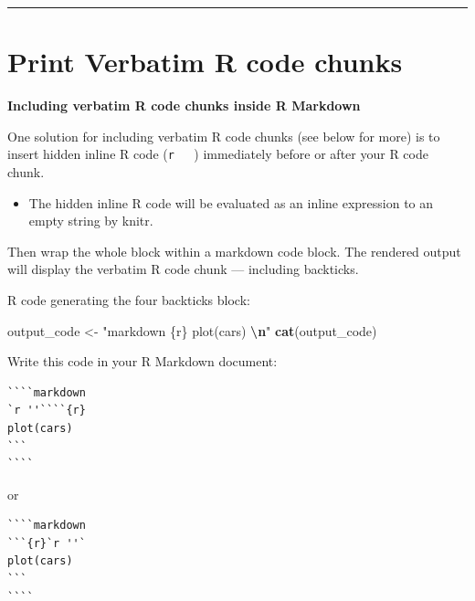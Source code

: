 \documentclass[
]{book}
\newenvironment{Shaded}{\begin{snugshade}}{\end{snugshade}}
\newcommand{\FunctionTok}[1]{\textcolor[rgb]{0.13,0.29,0.53}{\textbf{#1}}}
\newcommand{\NormalTok}[1]{#1}
\newcommand{\OtherTok}[1]{\textcolor[rgb]{0.56,0.35,0.01}{#1}}
\newcommand{\SpecialCharTok}[1]{\textcolor[rgb]{0.81,0.36,0.00}{\textbf{#1}}}
\newcommand{\StringTok}[1]{\textcolor[rgb]{0.31,0.60,0.02}{#1}}
\providecommand{\tightlist}{%
  \setlength{\itemsep}{0pt}\setlength{\parskip}{0pt}}
\begin{document}
\begin{center}\rule{0.5\linewidth}{0.5pt}\end{center}

\section{Print Verbatim R code chunks}\label{print-verbatim-r-code-chunks}

\textbf{Including verbatim R code chunks inside R Markdown}

One solution for including verbatim R code chunks (see below for more) is to insert hidden inline R code (\texttt{\textasciigrave{}r\ \ \ \textquotesingle{}\textquotesingle{}\textasciigrave{}}) immediately before or after your R code chunk.

\begin{itemize}
\tightlist
\item
  The hidden inline R code will be evaluated as an inline expression to an empty string by knitr.
\end{itemize}

Then wrap the whole block within a markdown code block. The rendered output will display the verbatim R code chunk --- including backticks.

R code generating the four backticks block:

\begin{Shaded}
\begin{Highlighting}[]
\NormalTok{output\_code }\OtherTok{\textless{}{-}}
\StringTok{"\textasciigrave{}\textasciigrave{}\textasciigrave{}\textasciigrave{}markdown}
\StringTok{\textasciigrave{}\textasciigrave{}\textasciigrave{}\{r\}}
\StringTok{plot(cars)}
\StringTok{\textasciigrave{}\textasciigrave{}\textasciigrave{} }\SpecialCharTok{\textbackslash{}n}\StringTok{\textasciigrave{}\textasciigrave{}\textasciigrave{}\textasciigrave{}"}
\FunctionTok{cat}\NormalTok{(output\_code)}
\end{Highlighting}
\end{Shaded}

Write this code in your R Markdown document:

\begin{verbatim}
````markdown
`r ''````{r}
plot(cars)
``` 
````
\end{verbatim}

or

\begin{verbatim}
````markdown
```{r}`r ''`
plot(cars)
``` 
````
\end{verbatim}
\end{document}
